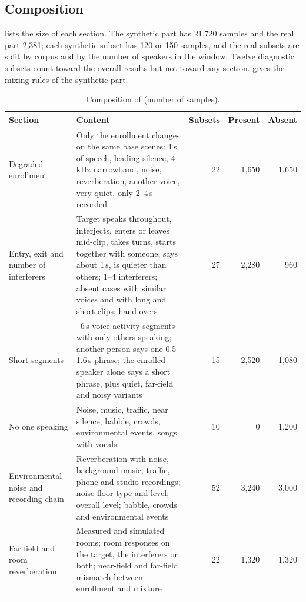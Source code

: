 \subsection{Composition}
\label{subsec:bench_composition}

 lists the size of each section.
The synthetic part has 21{,}720 samples and the real part 2{,}381; each synthetic subset has 120 or 150 samples, and the real subsets are split by corpus and by the number of speakers in the window.
Twelve diagnostic subsets count toward the overall results but not toward any section.
 gives the mixing rules of the synthetic part.

\begin{table}[t]
  \caption{Composition of \tsbench (number of samples).}
  \label{tab:bench_composition}
  \centering
  \small
  \begin{tabularx}{\linewidth}{@{}>{\raggedright\arraybackslash}p{3.0cm}>{\raggedright\arraybackslash}Xrrr@{}}
    \toprule
    Section & Content & Subsets & Present & Absent \\
    \midrule
    Degraded enrollment & Only the enrollment changes on the same base scenes: 1\,s of speech, leading silence, 4\,kHz narrowband, noise, reverberation, another voice, very quiet, only 2--4\,s recorded & 22 & 1{,}650 & 1{,}650 \\
    Entry, exit and number of interferers & Target speaks throughout, interjects, enters or leaves mid-clip, takes turns, starts together with someone, says about 1\,s, is quieter than others; 1--4 interferers; absent cases with similar voices and with long and short clips; hand-overs & 27 & 2{,}280 & 960 \\
    Short segments & 1.2--6\,s voice-activity segments with only others speaking; another person says one 0.5--1.6\,s phrase; the enrolled speaker alone says a short phrase, plus quiet, far-field and noisy variants & 15 & 2{,}520 & 1{,}080 \\
    No one speaking & Noise, music, traffic, near silence, babble, crowds, environmental events, songs with vocals & 10 & 0 & 1{,}200 \\
    Environmental noise and recording chain & Reverberation with noise, background music, traffic, phone and studio recordings; noise-floor type and level; overall level; babble, crowds and environmental events & 52 & 3{,}240 & 3{,}000 \\
    Far field and room reverberation & Measured and simulated rooms; room responses on the target, the interferers or both; near-field and far-field mismatch between enrollment and mixture & 22 & 1{,}320 & 1{,}320 \\

\end{tabularx}
\end{table}
